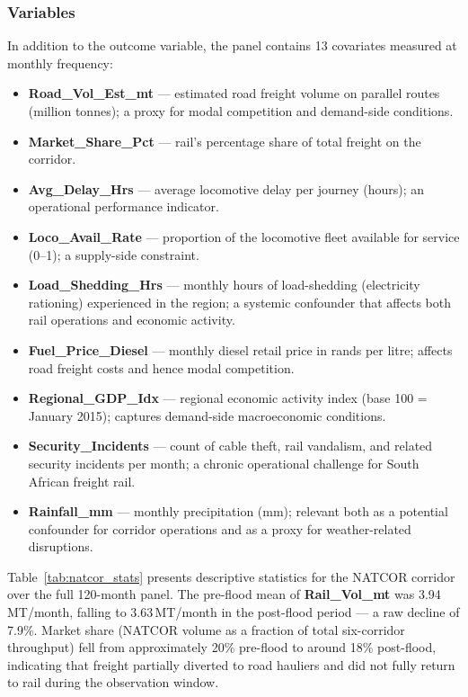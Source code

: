 \subsubsection{Variables}
\label{sec:variables}

In addition to the outcome variable, the panel contains 13 covariates
measured at monthly frequency:

\begin{itemize}
  \item \textbf{Road\_Vol\_Est\_mt} --- estimated road freight volume
        on parallel routes (million tonnes); a proxy for modal
        competition and demand-side conditions.
  \item \textbf{Market\_Share\_Pct} --- rail's percentage share of
        total freight on the corridor.
  \item \textbf{Avg\_Delay\_Hrs} --- average locomotive delay per
        journey (hours); an operational performance indicator.
  \item \textbf{Loco\_Avail\_Rate} --- proportion of the locomotive
        fleet available for service (0--1); a supply-side constraint.
  \item \textbf{Load\_Shedding\_Hrs} --- monthly hours of
        load-shedding (electricity rationing) experienced in the
        region; a systemic confounder that affects both rail
        operations and economic activity.
  \item \textbf{Fuel\_Price\_Diesel} --- monthly diesel retail price
        in rands per litre; affects road freight costs and hence
        modal competition.
  \item \textbf{Regional\_GDP\_Idx} --- regional economic activity
        index (base 100 = January 2015); captures demand-side
        macroeconomic conditions.
  \item \textbf{Security\_Incidents} --- count of cable theft, rail
        vandalism, and related security incidents per month; a
        chronic operational challenge for South African freight rail.
  \item \textbf{Rainfall\_mm} --- monthly precipitation (mm);
        relevant both as a potential confounder for corridor
        operations and as a proxy for weather-related disruptions.
\end{itemize}

Table~\ref{tab:natcor_stats} presents descriptive statistics for the
NATCOR corridor over the full 120-month panel.
The pre-flood mean of \textbf{Rail\_Vol\_mt} was 3.94\,MT/month,
falling to 3.63\,MT/month in the post-flood period --- a raw
decline of 7.9\%.
Market share (NATCOR volume as a fraction of total six-corridor
throughput) fell from approximately 20\% pre-flood to around 18\%
post-flood, indicating that freight partially diverted to road
hauliers and did not fully return to rail during the observation
window.

